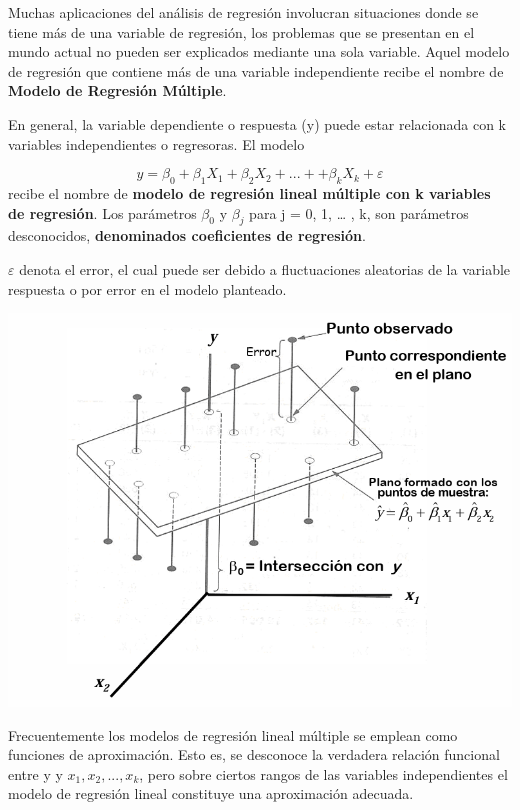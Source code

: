\documentclass[
]{book}
\begin{document}
Muchas aplicaciones del análisis de regresión involucran situaciones donde se tiene más de una variable de regresión, los problemas que se presentan en el mundo actual no pueden ser explicados mediante una sola variable. Aquel modelo de regresión que contiene más de una variable independiente recibe el nombre de \textbf{Modelo de Regresión Múltiple}.

En general, la variable dependiente o respuesta (y) puede estar relacionada con k variables independientes o regresoras. El modelo

\[
\begin{equation}
y=\beta _{0} + \beta _{1}X _{1} + \beta _{2}X _{2} + ... + + \beta _{k}X _{k} + \varepsilon
\label{eq:rlm}
\end {equation}
\]
recibe el nombre de \textbf{modelo de regresión lineal múltiple con k variables de regresión}. Los parámetros \(\beta _{0}\) y \(\beta _{j}\) para j = 0, 1, \ldots{} , k, son parámetros desconocidos, \textbf{denominados coeficientes de regresión}.

\(\varepsilon\) denota el error, el cual puede ser debido a fluctuaciones aleatorias de la variable respuesta o por error en el modelo planteado.

\begin{center}\includegraphics[width=10.88in]{imagen-1} \end{center}

Frecuentemente los modelos de regresión lineal múltiple se emplean como funciones de aproximación. Esto es, se desconoce la verdadera relación funcional entre y y \(x_{1},x_{2},...,x_{k}\), pero sobre ciertos rangos de las variables independientes el modelo de regresión lineal constituye una aproximación adecuada.
\end{document}
